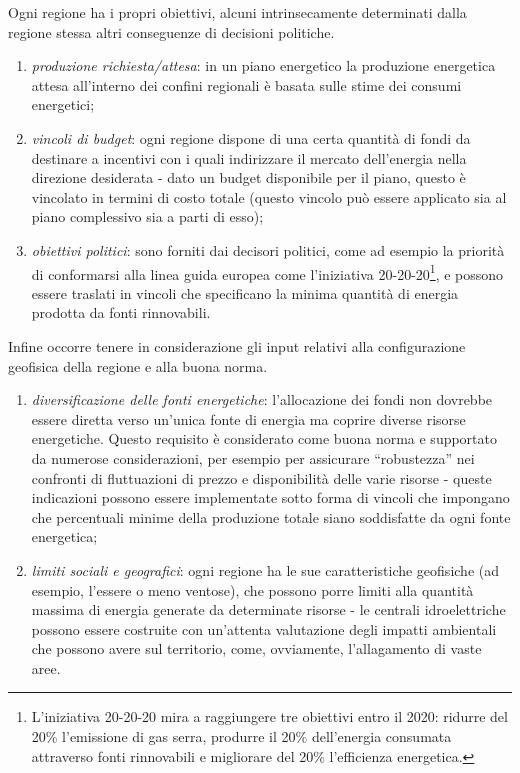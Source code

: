 \documentclass[12pt,a4paper,openright,twoside]{report}
\begin{document}
Ogni regione ha i propri obiettivi, alcuni intrinsecamente determinati dalla regione stessa altri conseguenze di decisioni politiche.
\begin{enumerate}
\item \emph{produzione richiesta/attesa}: in un piano energetico la produzione energetica attesa all'interno  dei confini regionali è basata sulle stime dei consumi energetici;
\item \emph{vincoli di budget}: ogni regione dispone di una certa quantità di fondi da destinare a incentivi con i quali indirizzare il mercato dell'energia nella direzione desiderata - dato un budget disponibile per il piano, questo è vincolato in termini di costo totale (questo vincolo può essere applicato sia al piano complessivo sia a parti di esso);
\item \emph{obiettivi politici}: sono forniti dai decisori politici, come ad esempio la priorità di conformarsi alla linea guida europea come l'iniziativa 20-20-20\footnote{L'iniziativa 20-20-20 mira a raggiungere tre obiettivi entro il 2020: ridurre del 20\% l'emissione di gas serra, produrre il 20\% dell'energia consumata attraverso fonti rinnovabili e migliorare del 20\% l'efficienza energetica.}, e possono essere traslati in vincoli che specificano la minima quantità di energia prodotta da fonti rinnovabili.
\end{enumerate} 

Infine occorre tenere in considerazione gli input relativi alla configurazione geofisica della regione e alla buona norma.
\begin{enumerate}
\item \emph{diversificazione delle fonti energetiche}: l'allocazione dei fondi non dovrebbe essere diretta verso un'unica fonte di energia ma coprire diverse risorse energetiche. Questo requisito è considerato come buona norma e supportato da numerose considerazioni, per esempio per assicurare ``robustezza'' nei confronti di fluttuazioni di prezzo e disponibilità delle varie risorse - queste indicazioni possono essere implementate sotto forma di vincoli che impongano che percentuali minime della produzione totale siano soddisfatte da ogni fonte energetica;
\item \emph{limiti sociali e geografici}: ogni regione ha le sue caratteristiche geofisiche (ad esempio, l'essere o meno ventose), che possono porre limiti alla quantità massima di energia generate da determinate risorse - le centrali idroelettriche possono essere costruite con un'attenta valutazione degli impatti ambientali che possono avere sul territorio, come, ovviamente, l'allagamento di vaste aree.
\end{enumerate} 
\end{document}
